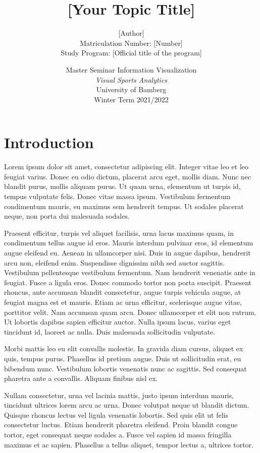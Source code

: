 \documentclass{article}
\title{[Your Topic Title]}
\author{[Author] \\
    \small Matriculation Number: [Number] \\ 
    \small Study Program: [Official title of the program] }
\date{ \vspace{0.5cm} \large 
  Master Seminar Information Visualization \\ 
  \emph{Visual Sports Analytics} \\ \vspace{0.2cm}
  University of Bamberg \\ \vspace{0.2cm}
  Winter Term 2021/2022}
\begin{document}
\maketitle


\section{Introduction}
\label{sec:introcution}

Lorem ipsum dolor sit amet, consectetur adipiscing elit. Integer vitae leo et leo feugiat varius. Donec eu odio dictum, placerat arcu eget, mollis diam. Nunc nec blandit purus, mollis aliquam purus. Ut quam urna, elementum ut turpis id, tempus vulputate felis. Donec vitae massa ipsum. Vestibulum fermentum condimentum mauris, eu maximus sem hendrerit tempus. Ut sodales placerat neque, non porta dui malesuada sodales.

Praesent efficitur, turpis vel aliquet facilisis, urna lacus maximus quam, in condimentum tellus augue id eros. Mauris interdum pulvinar eros, id elementum augue eleifend eu. Aenean in ullamcorper nisi. Duis in augue dapibus, hendrerit arcu non, eleifend enim. Suspendisse dignissim nibh sed auctor sagittis. Vestibulum pellentesque vestibulum fermentum. Nam hendrerit venenatis ante in feugiat. Fusce a ligula eros. Donec commodo tortor non porta suscipit. Praesent rhoncus, ante accumsan blandit consectetur, augue turpis vehicula augue, at feugiat magna est et mauris. Etiam ac urna efficitur, scelerisque augue vitae, porttitor velit. Nam accumsan quam arcu. Donec ullamcorper et elit non rutrum. Ut lobortis dapibus sapien efficitur auctor. Nulla ipsum lacus, varius eget tincidunt id, laoreet ac nulla. Duis malesuada sollicitudin vulputate.

Morbi mattis leo eu elit convallis molestie. In gravida diam cursus, aliquet ex quis, tempus purus. Phasellus id pretium augue. Duis ut sollicitudin erat, eu bibendum nunc. Vestibulum lobortis venenatis nunc ac sagittis. Sed consequat pharetra ante a convallis. Aliquam finibus nisl ex.

Nullam consectetur, urna vel lacinia mattis, justo ipsum interdum mauris, tincidunt ultrices lorem arcu ac urna. Donec volutpat neque ut blandit dictum. Quisque rhoncus lectus vel ligula venenatis lobortis. Sed quis elit ut felis consectetur luctus. Etiam hendrerit pharetra eleifend. Proin blandit congue tortor, eget consequat neque sodales a. Fusce vel sapien id massa fringilla maximus et ac sapien. Phasellus a tellus aliquet, tempor lectus a, ultrices tortor.
\end{document}
